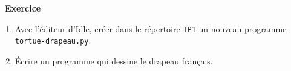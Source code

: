 \documentclass[
  11pt,
]{article}
\newcommand{\passthrough}[1]{#1}
\providecommand{\tightlist}{%
  \setlength{\itemsep}{0pt}\setlength{\parskip}{0pt}}
\newcounter{exo}
\newenvironment{exercice}[1]
{\par \medskip   \addtocounter{exo}{1} \noindent  
\begin{bclogo}[arrondi =0.1,   noborder = true, logo=\bccrayon, marge=4]{~\textbf{Exercice} \textbf{\theexo} {\itshape #1} }  \par}
{
\end{bclogo}
 \par \bigskip }
\newcounter{def}
\newcounter{prog}
\begin{document}
\begin{exercice}{}

\begin{enumerate}
\def\labelenumi{\arabic{enumi}.}
\tightlist
\item
  Avec l'éditeur d'Idle, créer dans le répertoire
  \passthrough{\lstinline!TP1!} un nouveau programme
  \passthrough{\lstinline!tortue-drapeau.py!}.
\item
  Écrire un programme qui dessine le drapeau français.
\end{enumerate}

\end{exercice}
\end{document}

